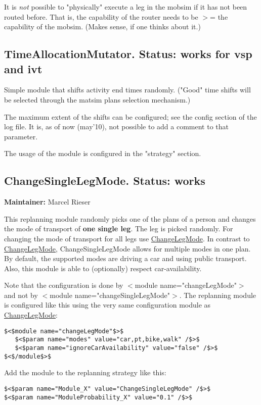 \documentclass[a4paper,11pt]{report}
\begin{document}
It is \emph{not} possible to "physically" execute a leg in the  mobsim if it has not been routed before. That is, the capability  of the router needs to be $>$= the capability of the mobsim.  (Makes sense, if one thinks about it.)

\subsection{TimeAllocationMutator.  Status: works for vsp and ivt}

Simple  module that shifts activity end times randomly. ("Good" time  shifts will be selected through the matsim plans selection mechanism.)

The maximum extent of the shifts can be configured; see the config  section of the log file. It is, as of now (may'10), not possible  to add a comment to that parameter.

The usage of the module is configured in the "strategy" section.

\subsection{ ChangeSingleLegMode. Status: works}

\textbf{Maintainer:} Marcel Rieser

This replanning module randomly picks one of the plans of a person and changes the mode of transport of \textbf{one single leg}. The leg is picked randomly. For changing the mode of transport for all legs use \href{http://www.matsim.org/node/387}{ChangeLegMode}. In contrast to \href{http://www.matsim.org/node/387}{ChangeLegMode},  ChangeSingleLegMode allows for multiple modes in one plan. By default,  the supported modes are driving a car and using public transport. Also,  this module is able to (optionally) respect car-availability.

Note that the configuration is done by $<$module  name="changeLegMode"$>$ and not by $<$module  name="changeSingleLegMode"$>$. The replanning module is configured like  this using the very same configuration module as \href{http://www.matsim.org/node/387}{ChangeLegMode}:
\begin{verbatim}
$<$module name="changeLegMode"$>$
   $<$param name="modes" value="car,pt,bike,walk" /$>$
   $<$param name="ignoreCarAvailability" value="false" /$>$
$<$/module$>$
\end{verbatim}

Add the module to the replanning strategy like this:
\begin{verbatim}
$<$param name="Module_X" value="ChangeSingleLegMode" /$>$
$<$param name="ModuleProbability_X" value="0.1" /$>$
\end{verbatim}
\end{document}

